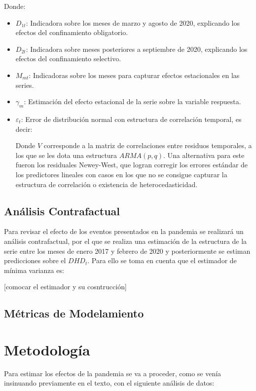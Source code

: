 \documentclass[10pt,twoside,xcolor=table,x11anmes]{IEEEtran}
\begin{document}
Donde:
\begin{itemize}
    \item $D_{1t}$: Indicadora sobre los meses de marzo y agosto de 2020, explicando los efectos del confinamiento obligatorio.
    \item $D_{2t}$: Indicadora sobre meses posteriores a  septiembre de 2020, explicando los efectos del confinamiento selectivo.
    \item $M_{mt}$: Indicadoras sobre los meses para capturar efectos estacionales en las series.
    \item $\gamma_{m}$: Estimación del efecto estacional de la serie sobre la variable respuesta.
    \item $\varepsilon_t$: Error de distribución normal con estructura de correlación temporal, es decir:

    Donde $V$ corresponde a la matriz de correlaciones entre residuos temporales, a los que se les dota una estructura $ARMA(p,q)$. Una alternativa para este fueron los residuales Newey-West, que logran corregir los errores estándar de los predictores lineales con casos en los que no se consigue capturar la estructura de correlación o existencia de heterocedasticidad.
\end{itemize}

\subsection{Análisis Contrafactual}

Para revisar el efecto de los eventos presentados en la pandemia se realizará un análisis contrafactual, por el que se realiza una estimación de la estructura de la serie entre los meses de enero 2017 y febrero de 2020 y posteriormente se estiman predicciones sobre el $DHD_t$. Para ello se toma en cuenta que el estimador de mínima varianza es:

[comocar el estimador y su cosntrucción]



\subsection{Métricas de Modelamiento}


\section[Metodología]{Metodología}

Para estimar los efectos de la pandemia se va a proceder, como se venía insinuando previamente en el texto, con el siguiente análisis de datos:
\end{document}
